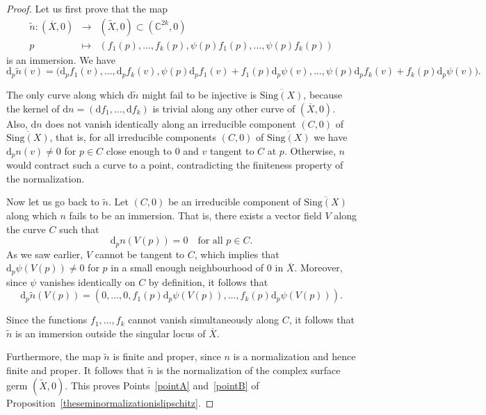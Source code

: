 \documentclass[reqno,dvipsnames,12pt]{amsart}
\begin{document}
\begin{proof}
Let us first prove that the map
$$
\begin{array}{ccc}
\widetilde{n} : (\overline{X},0) & \longrightarrow & (\widetilde{X},0)\subset(\mathbb{C}^{2k},0) \\
p & \longmapsto & (f_1(p),\ldots,f_k(p), \psi(p)f_1(p), \dots, \psi(p)f_k(p))
\end{array}
$$
is an immersion. We have 
$$
\mathrm{d}_p\widetilde{n}(v)
=
\bigl(
\mathrm{d}_pf_1(v),\ldots,\mathrm{d}_pf_k(v),
\psi(p)\mathrm{d}_pf_1(v)+f_1(p)\mathrm{d}_p\psi(v),\ldots,
\psi(p)\mathrm{d}_pf_k(v)+f_k(p)\mathrm{d}_p\psi(v)
\bigr).
$$

The only curve along which $\mathrm{d}\widetilde{n}$ might fail to be injective is $\overline{\mathrm{Sing}(X)}$, because the kernel of $\mathrm{d}n=(\mathrm{d}f_1,\ldots,\mathrm{d}f_k)$
is  trivial along any other curve of $(\overline{X},0)$. Also, $\mathrm{d}n$ does not vanish identically along an irreducible component $(C,0)$ of $\overline{\mathrm{Sing}(X)}$, that is, for all irreducible components $(C,0)$ of $\overline{\mathrm{Sing}(X)}$ we have $\mathrm{d}_pn(v)\neq 0$ for $p\in C$ close enough to $0$ and $v$ tangent to $C$ at $p$. Otherwise, $n$ would contract such a curve to a point, contradicting the finiteness property of the normalization.

Now let us go back to $\widetilde{n}$. Let $(C,0)$ be an irreducible component of $\overline{\mathrm{Sing}(X)}$ along which $n$ fails to be an immersion. That is, there exists a vector field $V$ along the curve $C$ such that
\[
\mathrm{d}_p n(V(p))=0
\quad \text{for all } p\in C.
\]
As we saw earlier, $V$ cannot be tangent to $C$, which implies that $\mathrm{d}_p\psi(V(p))\neq 0$
for $p$ in a small enough neighbourhood of $0$ in $\overline{X}$. Moreover, since $\psi$ vanishes identically on $C$ by definition, it follows that
\[
\mathrm{d}_p\widetilde{n}(V(p))
=
(0,\ldots,0,f_1(p)\mathrm{d}_p\psi(V(p)),\ldots,f_k(p)\mathrm{d}_p\psi(V(p))).
\]

Since the functions $f_1,\ldots,f_k$ cannot vanish simultaneously along $C$, it follows that $\widetilde{n}$ is an immersion outside the singular locus of $\overline{X}$. 


Furthermore, the map $\widetilde{n}$ is finite and proper, since $n$ is a normalization and hence finite and proper. It follows that $\widetilde{n}$ is the normalization of the complex surface germ $(\widetilde{X},0)$. This proves Points~\ref{pointA} and~\ref{pointB} of Proposition~\ref{theseminormalizationislipschitz}.












\end{proof}
\end{document}
